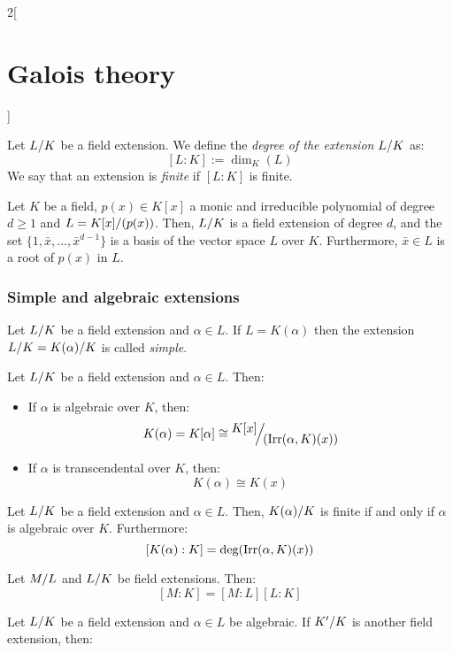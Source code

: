 \documentclass[../../../main.tex]{subfiles}
\begin{document}
\begin{multicols}{2}[\section{Galois theory}]
\begin{prop}
  \end{prop}
  \begin{definition}
    Let $\quot{L}{K}$ be a field extension. We define the \textit{degree of the extension $\quot{L}{K}$} as: $$[L:K]:=\dim_K(L)$$ We say that an extension is \textit{finite} if $[L:K]$ is finite.
  \end{definition}
  \begin{prop}
    Let $K$ be a field, $p(x)\in K[x]$ a monic and irreducible polynomial of degree $d\geq 1$ and $L=\quot{K[x]}{(p(x))}$. Then, $\quot{L}{K}$ is a field extension of degree $d$, and the set $\{1,\bar{x},\ldots,\bar{x}^{d-1}\}$ is a basis of the vector space $L$ over $K$. Furthermore, $\bar{x}\in L$ is a root of $p(x)$ in $L$.
  \end{prop}
  \subsubsection*{Simple and algebraic extensions}
  \begin{definition}
    Let $\quot{L}{K}$ be a field extension and $\alpha\in L$. If $L=K(\alpha)$ then the extension $\quot{L}{K}=\quot{K(\alpha)}{K}$ is called \textit{simple}.
  \end{definition}
  \begin{prop}
    Let $\quot{L}{K}$ be a field extension and $\alpha\in L$. Then:
    \begin{itemize}
      \item If $\alpha$ is algebraic over $K$, then: $$K(\alpha)=K[\alpha]\cong\quot{K[x]}{(\irr(\alpha,K)(x))}$$
      \item If $\alpha$ is transcendental over $K$, then: $$K(\alpha)\cong K(x)$$
    \end{itemize}
  \end{prop}
  \begin{corollary}
    Let $\quot{L}{K}$ be a field extension and $\alpha\in L$. Then, $\quot{K(\alpha)}{K}$ is finite if and only if $\alpha$ is algebraic over $K$. Furthermore: $$[K(\alpha):K]=\deg(\operatorname{Irr}(\alpha,K)(x))$$
  \end{corollary}
  \begin{theorem}
    Let $\quot{M}{L}$ and $\quot{L}{K}$ be field extensions. Then: $$[M:K]=[M:L][L:K]$$
  \end{theorem}
  \begin{prop}
    Let $\quot{L}{K}$ be a field extension and $\alpha\in L$ be algebraic. If $\quot{K'}{K}$ is another field extension, then:
    \begin{enumerate}

\end{enumerate}
\end{prop}
\end{multicols}
\end{document}
